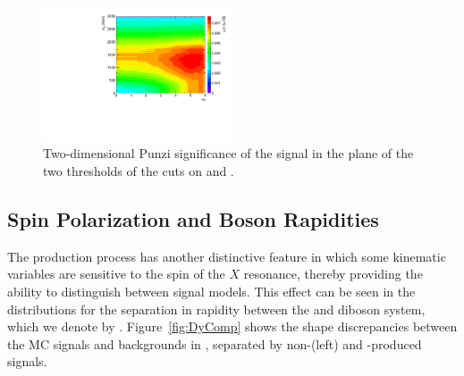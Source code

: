\begin{figure}[htbp]
  \centering
  \includegraphics[width=0.5\textwidth]{fig/eventSelection/detaMjjSB.pdf}
  \caption{
    Two-dimensional Punzi significance of the \VBF\RadtoWW signal in the plane of the two thresholds of the cuts on \DetaVBF and \mjjVBF.
  }
  \label{fig:detaMjjSB_VBF}
\end{figure}

\subsection{Spin Polarization and Boson Rapidities}
\label{subsec:spinPol}

The \VBF production process has another distinctive feature in which some kinematic variables are sensitive to the spin of the $X$ resonance, thereby providing the ability to distinguish between signal models.
This effect can be seen in the distributions for the separation in rapidity between the \Vhad and \Wlep diboson system, which we denote by \Dy.
Figure~\ref{fig:DyComp} shows the shape discrepancies between the MC signals and backgrounds in \Dy, separated by non-\VBF (left) and \VBF-produced signals.

